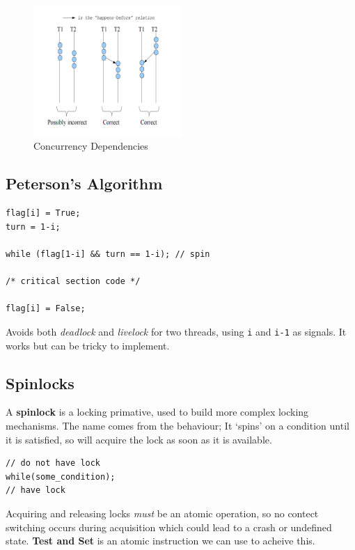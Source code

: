 \documentclass{article}
\begin{document}
\begin{figure}[h!]
  \centering
  \includegraphics[width=0.5\textwidth]{correctConcurrency}
  \caption{Concurrency Dependencies}
\end{figure}


\subsection{Peterson's Algorithm}\label{petersons-algorithm}

\begin{verbatim}
flag[i] = True;
turn = 1-i;

while (flag[1-i] && turn == 1-i); // spin

/* critical section code */

flag[i] = False;
\end{verbatim}

Avoids both \emph{deadlock} and \emph{livelock} for two threads, using
\texttt{i} and \texttt{i-1} as signals. It works but can be tricky to
implement.

\subsection{Spinlocks}\label{spinlocks}

A \textbf{spinlock} is a locking primative, used to build more complex
locking mechanisms. The name comes from the behaviour; It `spins' on a
condition until it is satisfied, so will acquire the lock as soon as it
is available.

\begin{verbatim}
// do not have lock
while(some_condition);
// have lock
\end{verbatim}

Acquiring and releasing locks \emph{must} be an atomic operation, so no
contect switching occurs during acquisition which could lead to a crash
or undefined state. \textbf{Test and Set} is an atomic instruction we
can use to acheive this.
\end{document}
